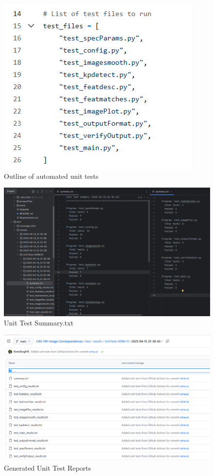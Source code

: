 \documentclass[12pt, titlepage]{article}
\begin{document}
\begin{figure}[h!]
  \centering
  \includegraphics[width=0.5\linewidth]{images/unit_test_names.png}
  \caption{Outline of automated unit tests}
  \label{unit_tests}
\end{figure}

\begin{figure}[h!]
  \centering
  \includegraphics[width=1.2\linewidth]{images/ut_pass_fail.png}
  \caption{Unit Test Summary.txt}
  \label{unit_tests_summary}
\end{figure}

\begin{figure}[h!]
  \centering
  \includegraphics[width=1.1\linewidth]{images/ut_reports.png}
  \caption{Generated Unit Test Reports}
  \label{unit_tests_reports}
\end{figure}
\end{document}
